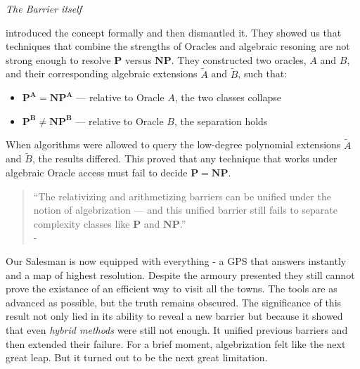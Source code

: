 \documentclass[12pt]{report}
\begin{document}
\begin{center}
    {\Large\itshape The Barrier itself\par}
\end{center}
\cite{arora2008algebrization} introduced the concept formally and then dismantled it.
They showed us that techniques that combine the strengths of Oracles and algebraic resoning are not strong enough to resolve $\mathbf{P}$ versus $\mathbf{NP}$.  
They constructed two oracles, $A$ and $B$, and their corresponding algebraic extensions $\tilde{A}$ and $\tilde{B}$, such that:
\begin{itemize}
    \item $\mathbf{P^A = NP^A}$ — relative to Oracle $A$, the two classes collapse
    \item $\mathbf{P^B \ne NP^B}$ — relative to Oracle $B$, the separation holds
\end{itemize}
When algorithms were allowed to query the low-degree polynomial extensions $\tilde{A}$ and $\tilde{B}$, the results differed.
This proved that any technique that works under algebraic Oracle access must fail to decide $\mathbf{P = NP}$.
\begin{quote}
    “The relativizing and arithmetizing barriers can be unified under the notion of algebrization — and this unified barrier still fails to separate complexity classes like $\mathbf{P}$ and $\mathbf{NP}$.”\\
    - \cite{arora2008algebrization}
\end{quote}

Our Salesman is now equipped with everything - a GPS that answers instantly and a map of highest resolution.
Despite the armoury presented they still cannot prove the existance of an efficient way to visit all the towns.
The tools are as advanced as possible, but the truth remains obscured.
The significance of this result not only lied in its ability to reveal a new barrier but because it showed that even \textit{hybrid methods} were still not enough.
It unified previous barriers and then extended their failure.
For a brief moment, algebrization felt like the next great leap.
But it turned out to be the next great limitation.
\end{document}
